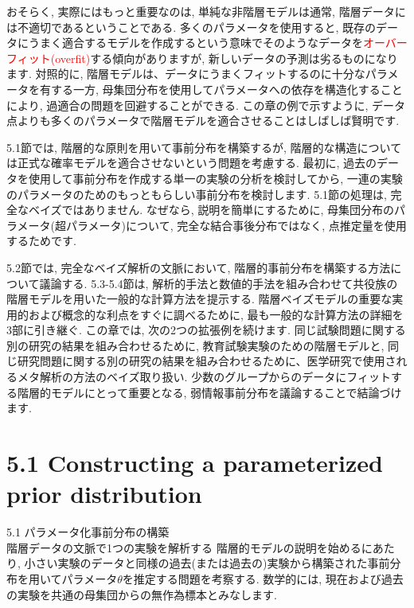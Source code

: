 \documentclass[10pt,dvipdfmx,a4]{beamer}
\newcommand{\tcr}[1]{\textcolor{red}{#1}}
\begin{document}
\begin{frame}
おそらく, 実際にはもっと重要なのは, 単純な非階層モデルは通常, 階層データには不適切であるということである.
多くのパラメータを使用すると, 既存のデータにうまく適合するモデルを作成するという意味でそのようなデータを\tcr{オーバーフィット(overfit)}する傾向がありますが, 新しいデータの予測は劣るものになります.
対照的に, 階層モデルは、データにうまくフィットするのに十分なパラメータを有する一方, 母集団分布を使用してパラメータへの依存を構造化することにより, 過適合の問題を回避することができる.
この章の例で示すように, データ点よりも多くのパラメータで階層モデルを適合させることはしばしば賢明です.

5.1節では, 階層的な原則を用いて事前分布を構築するが, 階層的な構造については正式な確率モデルを適合させないという問題を考慮する.
最初に, 過去のデータを使用して事前分布を作成する単一の実験の分析を検討してから, 一連の実験のパラメータのためのもっともらしい事前分布を検討します.
5.1節の処理は, 完全なベイズではありません.
なぜなら, 説明を簡単にするために, 母集団分布のパラメータ(超パラメータ)について, 完全な結合事後分布ではなく, 点推定量を使用するためです.
\end{frame}


\begin{frame}
5.2節では, 完全なベイズ解析の文脈において, 階層的事前分布を構築する方法について議論する.
5.3-5.4節は, 解析的手法と数値的手法を組み合わせて共役族の階層モデルを用いた一般的な計算方法を提示する.
階層ベイズモデルの重要な実用的および概念的な利点をすぐに調べるために, 最も一般的な計算方法の詳細を3部に引き継ぐ.
この章では, 次の2つの拡張例を続けます.
同じ試験問題に関する別の研究の結果を組み合わせるために, 教育試験実験のための階層モデルと, 同じ研究問題に関する別の研究の結果を組み合わせるために、医学研究で使用されるメタ解析の方法のベイズ取り扱い.
少数のグループからのデータにフィットする階層的モデルにとって重要となる, 弱情報事前分布を議論することで結論づけます.
\end{frame}

\section{5.1 Constructing a parameterized prior distribution}
\begin{frame}{5.1 パラメータ化事前分布の構築\\階層データの文脈で1つの実験を解析する}
階層的モデルの説明を始めるにあたり, 小さい実験のデータと同様の過去(または過去の)実験から構築された事前分布を用いてパラメータ$\theta$を推定する問題を考察する.
数学的には, 現在および過去の実験を共通の母集団からの無作為標本とみなします.
\end{frame}
\end{document}
